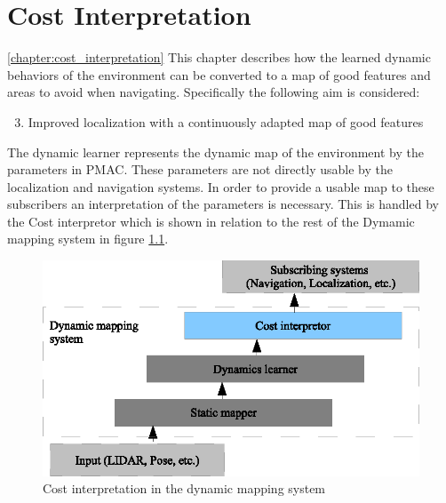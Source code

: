 \chapter{Cost Interpretation}
\ref{chapter:cost_interpretation}
This chapter describes how the learned dynamic behaviors of the environment can be converted to a map of good features and areas to avoid when navigating. Specifically the following aim is considered:

\begin{enumerate}
    \setcounter{enumi}{2}
    \item Improved localization with a continuously adapted map of good features
\end{enumerate}

The dynamic learner represents the dynamic map of the environment by the parameters in PMAC. These parameters are not directly usable by the localization and navigation systems. In order to provide a usable map to these subscribers an interpretation of the parameters is necessary. This is handled by the Cost interpretor which is shown in relation to the rest of the Dymamic mapping system in figure \ref{fig:cost_overview}.

\begin{figure}[htbp]
	\centering
	\includegraphics[scale=1]{chapters/cost_interpretation/figures/cost_overview.eps}
	\caption{Cost interpretation in the dynamic mapping system}
	\label{fig:cost_overview}
\end{figure}








